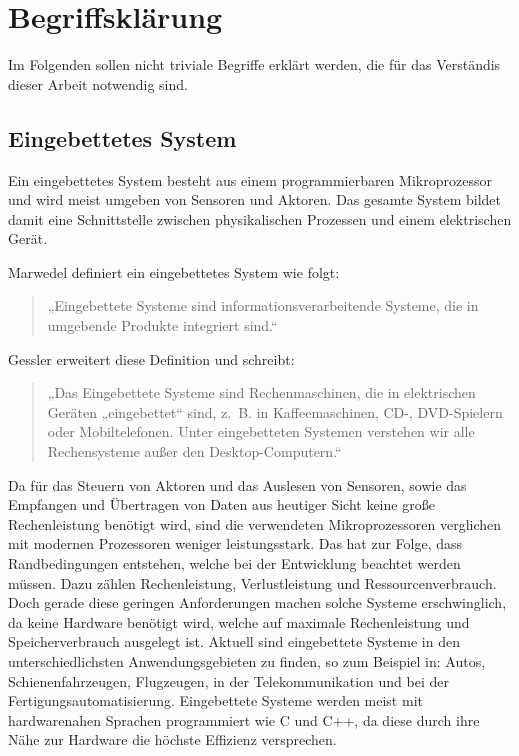 \chapter{Begriffsklärung}
Im Folgenden sollen nicht triviale Begriffe erklärt werden, die für das Verständis dieser Arbeit notwendig sind.

\section{Eingebettetes System}
Ein eingebettetes System besteht aus einem programmierbaren Mikroprozessor und wird meist umgeben von Sensoren und Aktoren.
Das gesamte System bildet damit eine Schnittstelle zwischen physikalischen Prozessen und einem elektrischen Gerät.

Marwedel definiert ein eingebettetes System wie folgt:
\begin{quote}
    „Eingebettete Systeme sind informationsverarbeitende Systeme, die in umgebende Produkte integriert sind.“\cite{marwedelEingebetteteSystemeGrundlagen2021}
\end{quote}

Gessler erweitert diese Definition und schreibt:
\begin{quote}
    „Das Eingebettete Systeme sind Rechenmaschinen, die in elektrischen Geräten „eingebettet“ sind, z. B. in Kaffeemaschinen, CD-, DVD-Spielern oder Mobiltelefonen.
    Unter eingebetteten Systemen verstehen wir alle Rechensysteme außer den Desktop-Computern.“\cite{gesslerEntwicklungEingebetteterSysteme2014}
\end{quote}

Da für das Steuern von Aktoren und das Auslesen von Sensoren, sowie das Empfangen und Übertragen von Daten aus heutiger Sicht keine große Rechenleistung benötigt wird, sind die verwendeten Mikroprozessoren verglichen mit modernen Prozessoren weniger leistungsstark.
Das hat zur Folge, dass Randbedingungen entstehen, welche bei der Entwicklung beachtet werden müssen.
Dazu zählen Rechenleistung, Verlustleistung und Ressourcenverbrauch\cite{gesslerEntwicklungEingebetteterSysteme2014}.
Doch gerade diese geringen Anforderungen machen solche Systeme erschwinglich, da keine Hardware benötigt wird, welche auf maximale Rechenleistung und Speicherverbrauch ausgelegt ist.
Aktuell sind eingebettete Systeme in den unterschiedlichsten Anwendungsgebieten zu finden, so zum Beispiel in: Autos, Schienenfahrzeugen, Flugzeugen, in der Telekommunikation und bei der Fertigungsautomatisierung\cite{marwedelEingebetteteSystemeGrundlagen2021}.
Eingebettete Systeme werden meist mit hardwarenahen Sprachen programmiert wie C und C++, da diese durch ihre Nähe zur Hardware die höchste Effizienz versprechen\cite{gesslerEntwicklungEingebetteterSysteme2014}.

